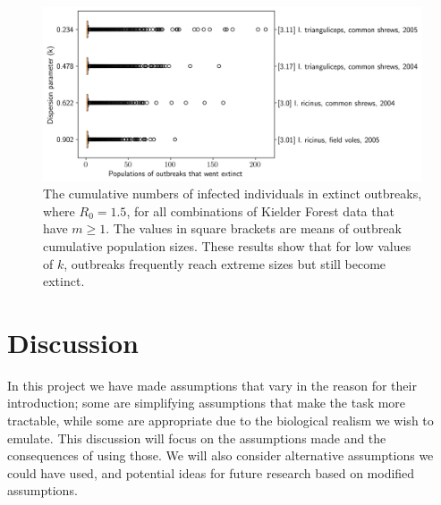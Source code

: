 \documentclass[hidelinks]{article}
\begin{document}
\begin{figure}[]
	\begin{mdframed}[backgroundcolor=grey250,rightline=false,leftline=false,topline=false]
		\centering
		\includegraphics[width=.73\linewidth,valign=m]{allCombinations_populationsOfOutbreaksThatWentExtinct}
		\caption{The cumulative numbers of infected individuals in extinct outbreaks, where $ R_0 = 1.5 $, for all combinations of Kielder Forest data that have $ m \ge 1 $. The values in square brackets are means of outbreak cumulative population sizes. These results show that for low values of $ k $, outbreaks frequently reach extreme sizes but still become extinct.}
		\label{fig:allCombinations_populationsOfOutbreaksThatWentExtinct}
	\end{mdframed}
\end{figure}

\clearpage
\newpage

\section{Discussion}

In this project we have made assumptions that vary in the reason for their introduction; some are simplifying assumptions that make the task more tractable, while some are appropriate due to the biological realism we wish to emulate. This discussion will focus on the assumptions made and the consequences of using those. We will also consider alternative assumptions we could have used, and potential ideas for future research based on modified assumptions.
\end{document}
